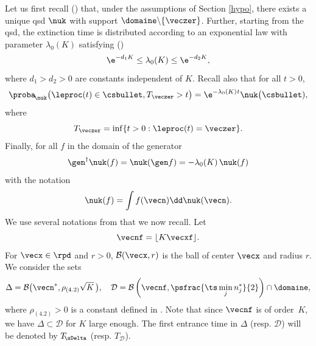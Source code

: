 Let us first recall (\cf \cite{ccm2}) that, under the assumptions of Section \ref{hypo}, there exists a unique qsd $
\nuk$ with support $\domaine\backslash \{\veczer\}$.
Further, starting from the qsd, the extinction time is distributed according to an exponential law with parameter
$\lambda_{0}(K)$ satisfying (\cite[Th.\,3.2]{ccm2})
\begin{equation}
\label{eq:lambda0}
\e^{-d_{1} K}\le\lambda_{0}(K)\le \e^{-d_{2} K},
\end{equation}
where $d_{1}>d_{2}>0$ are constants independent of $K$.
Recall also that for all $t>0$,
\begin{equation}
\label{pte-qsd}
\proba_{\!\nuk}\bigl(\leproc(t)\in \csbullet,T_{\veczer}>t\bigr)=
\e^{-\lambda_{0}(K)\hspace{.4pt}t}\nuk\bigl(\csbullet),
\end{equation}
where
\[
T_{\veczer}=\inf\{t>0: \leproc(t)=\veczer\}.
\]
Finally, for all $f$ in the domain of the generator
\begin{equation}
\label{eq:miracle}
\gen^{\dagger}\nuk(f)=\nuk(\gen f)= - \lambda_{0}(K)\,\nuk(f)
\end{equation}
with the notation
\[
\nuk(f)=\int f(\vecn) \dd\nuk(\vecn).
\]
We use several notations from \cite{ccm2} that we now recall. Let
\[
\vecnf= \lfloor K \vecxf\rfloor.
\]
For $\vecx\in\rpd$ and $r>0$, $\mathcal{B}(\vecx,r)$ is the ball of center $\vecx$ and radius $r$.
We consider the sets
\begin{equation}
\label{boule}
\Delta = \mathcal{B}\bigl(\vecn^*,\rho_{(4.2)}\sqrt{K}\,\bigr), \quad\mathcal{D} = \mathcal{B} \left(\vecnf,\psfrac{\ts\min_{j} n_{j}^*}{2}\right)\cap \domaine,
\end{equation}
where $\rho_{(4.2)}>0$ is a constant defined in \cite[Cor.\,4.2]{ccm2}.
Note that since $\vecnf$ is of order~$K$, we have
$\Delta \subset \mathcal{D}$ for $K$ large enough. The first entrance time in $\Delta$ (resp. $
\mathcal{D}$) will be denoted by $T_{\!\sDelta}$ (resp. $T_\mathcal{D}$).

